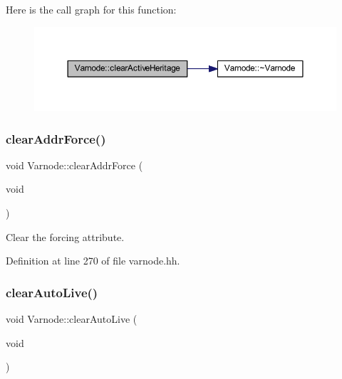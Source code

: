 Here is the call graph for this function\+:
\nopagebreak
\begin{figure}[H]
\begin{center}
\leavevmode
\includegraphics[width=350pt]{class_varnode_acb345a601ccf9b3d13038d01b1963fa5_cgraph}
\end{center}
\end{figure}
\mbox{\label{class_varnode_a0bf342375fe44d491f5570ffd514a08a}} 
\subsubsection{\texorpdfstring{clearAddrForce()}{clearAddrForce()}}
{\footnotesize\ttfamily void Varnode\+::clear\+Addr\+Force (\begin{DoxyParamCaption}\item[{void}]{ }\end{DoxyParamCaption})\hspace{0.3cm}{\ttfamily [inline]}}



Clear the forcing attribute. 



Definition at line 270 of file varnode.\+hh.

\mbox{\label{class_varnode_a39d6bd8e32a09ade4ce560a4356c379b}} 
\subsubsection{\texorpdfstring{clearAutoLive()}{clearAutoLive()}}
{\footnotesize\ttfamily void Varnode\+::clear\+Auto\+Live (\begin{DoxyParamCaption}\item[{void}]{ }\end{DoxyParamCaption})\hspace{0.3cm}{\ttfamily [inline]}}



